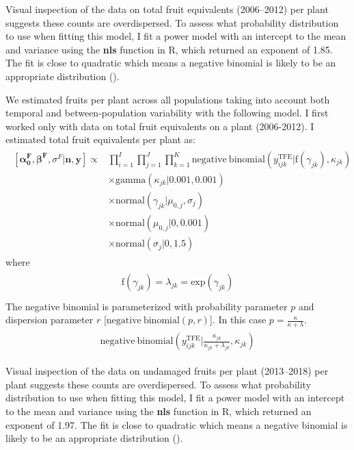 \documentclass[12pt, oneside, titlepage]{article}   	%
\begin{document}
Visual inspection of the data on total fruit equivalents (2006--2012) per plant suggests these counts are overdispersed. To assess what probability distribution to use when fitting this model, I fit a power model with an intercept to the mean and variance using the \textbf{nls} function in R, which returned an exponent of 1.85. The fit is close to quadratic which means a negative binomial is likely to be an appropriate distribution (\cite{linden2011}). 

We estimated fruits per plant across all populations taking into account both temporal and between-population variability with the following model. I first worked only with data on total fruit equivalents on a plant (2006-2012). I estimated total fruit equivalents per plant as: 
%
\begin{align}
  \begin{split}
 [ \bm{\alpha^F_0}, \bm{\beta^F}, \sigma^F | \bm{n}, \bm{y} ] \propto 
 & \prod_{i=1}^{I} \prod_{j=1}^{J} \prod_{k=1}^{K}  \mathrm{negative \ binomial} ( y^{\mathrm{TFE}}_{ijk} | \mathrm{f} ( \gamma_{jk} ),  \kappa_{jk} ) 
     \\ & \times \mathrm{gamma} ( \kappa_{jk} | 0.001 , 0.001 ) 
     \\ & \times \mathrm{normal} ( \gamma_{jk} | \mu_{0,j} , \sigma_j) 
    \\ & \times \mathrm{normal} ( \mu_{0,j} | 0, 0.001 ) 
    \\ & \times \mathrm{normal} ( \sigma_j | 0, 1.5 )  
   \end{split}
\end{align}
%
where
%
\begin{align}
  \begin{split}
\mathrm{f} ( \gamma_{jk} ) = \lambda_{jk} = \mathrm{exp}(  \gamma_{jk} ) \\
  \end{split}
\end{align}
%
The negative binomial is parameterized with probability parameter $p$ and dispersion parameter $r$ [$ \mathrm{negative \ binomial}(p,r)$]. In this case $p=\frac{\kappa}{\kappa+\lambda}$.
%
\begin{align}
  \begin{split}
  \mathrm{negative \ binomial} ( y^{\mathrm{TFE}}_{ijk} | \frac{\kappa_{jk}}{\kappa_{jk} + \lambda_{jk}} ,  \kappa_{jk} )
  \end{split}
\end{align}
%

Visual inspection of the data on undamaged fruits per plant (2013--2018) per plant suggests these counts are overdispersed. To assess what probability distribution to use when fitting this model, I fit a power model with an intercept to the mean and variance using the \textbf{nls} function in R, which returned an exponent of 1.97. The fit is close to quadratic which means a negative binomial is likely to be an appropriate distribution (\cite{linden2011}). 
\end{document}
